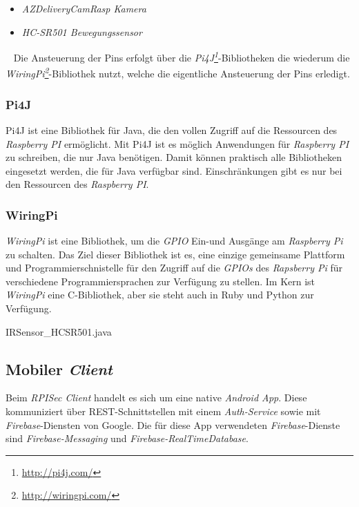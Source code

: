\begin{itemize}
	\item \emph{AZDeliveryCamRasp Kamera}
	\item \emph{HC-SR501 Bewegungssensor}
\end{itemize}
\ \newline
Die Ansteuerung der Pins erfolgt über die \emph{Pi4J\footnote{\url{http://pi4j.com/}}}-Bibliotheken die wiederum die \emph{WiringPi\footnote{\url{http://wiringpi.com/}}}-Bibliothek nutzt, welche die eigentliche Ansteuerung der Pins erledigt.

\subsubsection{Pi4J}
Pi4J ist eine Bibliothek  für Java, die den vollen Zugriff auf die Ressourcen des \emph{Raspberry PI} ermöglicht. Mit Pi4J ist es möglich Anwendungen für \emph{Raspberry PI} zu schreiben, die nur Java benötigen. Damit können praktisch alle Bibliotheken eingesetzt werden, die für Java verfügbar sind. Einschränkungen gibt es nur bei den Ressourcen des \emph{Raspberry PI}.

\subsubsection{WiringPi}
\emph{WiringPi} ist eine Bibliothek, um die \emph{GPIO} Ein-und Ausgänge am \emph{Raspberry Pi} zu schalten. Das Ziel dieser Bibliothek ist es, eine einzige gemeinsame Plattform und Programmierschnistelle für den Zugriff auf die \emph{GPIOs} des \emph{Rapsberry Pi} für verschiedene Programmiersprachen zur Verfügung zu stellen. Im Kern ist \emph{WiringPi} eine C-Bibliothek, aber sie steht auch in Ruby und Python zur Verfügung.
\newpage

\begin{code}
	\caption{IRSensor\_HCSR501.java}
	\label{src:gpio-controller}
\end{code}

\subsection{Mobiler \emph{Client}}
Beim \emph{RPISec Client} handelt es sich um eine native \emph{Android App}. Diese kommuniziert über REST-Schnittstellen mit einem \emph{Auth-Service} sowie mit \emph{Firebase}-Diensten von Google. Die für diese App verwendeten \emph{Firebase}-Dienste sind \emph{Firebase-Messaging} und \emph{Firebase-RealTimeDatabase}.\\

